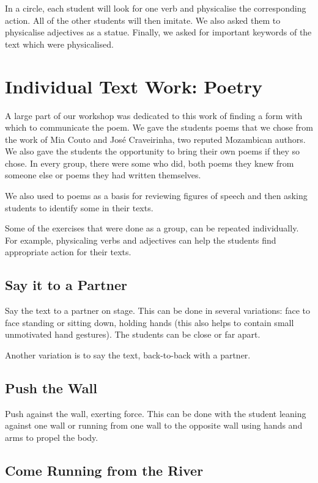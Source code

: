 \documentclass[article,twocolumn,twoside]{memoir}
\begin{document}
In a circle, each student will look for one verb and physicalise the
corresponding action. All of the other students will then imitate. We also
asked them to physicalise adjectives as a statue. Finally, we asked for
important keywords of the text which were physicalised.

\section{Individual Text Work: Poetry}

A large part of our workshop was dedicated to this work of finding a form with
which to communicate the poem. We gave the students poems that we chose from
the work of Mia Couto and José Craveirinha, two reputed Mozambican authors. We
also gave the students the opportunity to bring their own poems if they so
chose. In every group, there were some who did, both poems they knew from
someone else or poems they had written themselves.

We also used to poems as a basis for reviewing figures of speech and then
asking students to identify some in their texts.

Some of the exercises that were done as a group, can be repeated individually.
For example, physicaling verbs and adjectives can help the students find
appropriate action for their texts.

\subsection{Say it to a Partner}

Say the text to a partner on stage. This can be done in several variations:
face to face standing or sitting down, holding hands (this also helps to
contain small unmotivated hand gestures). The students can be close or far apart.

Another variation is to say the text, back-to-back with a partner.

\subsection{Push the Wall}

Push against the wall, exerting force. This can be done with the student
leaning against one wall or running from one wall to the opposite wall using
hands and arms to propel the body.

\subsection{Come Running from the River}
\end{document}
